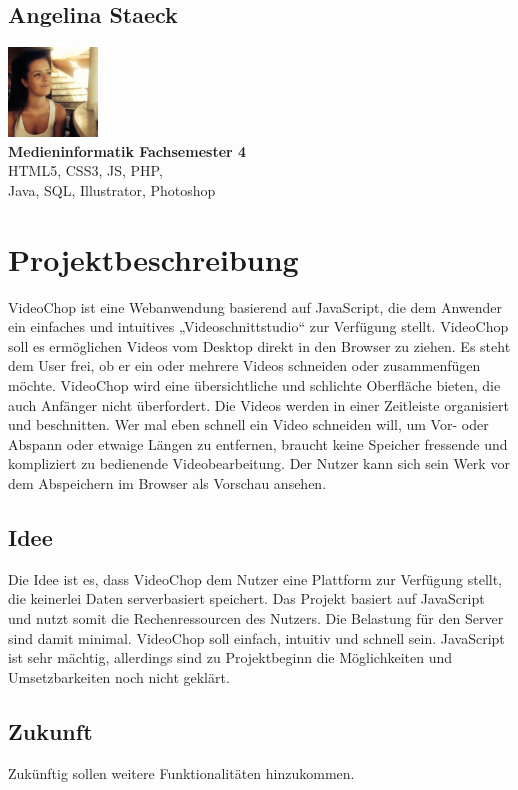 \documentclass[a4paper,10pt]{scrartcl}
\begin{document}
\subsection{Angelina Staeck}
\begin{center}
\includegraphics[height=90px, width=90px]{images/angi.jpg}\\
\textbf{Medieninformatik Fachsemester 4} \\
\vspace*{1.5mm} 
HTML5, CSS3, JS, PHP, \\
Java, SQL, Illustrator, Photoshop
\end{center}
\newpage
\section{Projektbeschreibung}
VideoChop ist eine Webanwendung basierend auf JavaScript, die dem Anwender  ein einfaches und intuitives „Videoschnittstudio“ zur Verfügung stellt. VideoChop soll es ermöglichen Videos vom Desktop direkt in den Browser zu ziehen. Es steht dem User frei, ob er ein oder mehrere Videos schneiden oder zusammenfügen möchte. VideoChop wird eine übersichtliche und schlichte Oberfläche bieten, die auch Anfänger nicht überfordert. Die Videos werden in einer Zeitleiste organisiert und beschnitten. Wer mal eben schnell ein Video schneiden will, um Vor- oder Abspann oder etwaige Längen zu entfernen, braucht keine Speicher fressende und kompliziert zu bedienende Videobearbeitung. Der Nutzer kann sich sein Werk vor dem Abspeichern im Browser als Vorschau ansehen.
\subsection{Idee}
Die Idee ist es, dass VideoChop dem Nutzer eine Plattform zur Verfügung stellt, die keinerlei Daten serverbasiert speichert. Das Projekt basiert auf JavaScript und nutzt somit die Rechenressourcen des Nutzers. Die Belastung für den Server sind damit minimal. VideoChop soll einfach, intuitiv und schnell sein. JavaScript ist sehr mächtig, allerdings sind zu Projektbeginn die Möglichkeiten und Umsetzbarkeiten noch nicht geklärt.
\subsection{Zukunft}
Zukünftig sollen weitere Funktionalitäten hinzukommen. 
\end{document}
